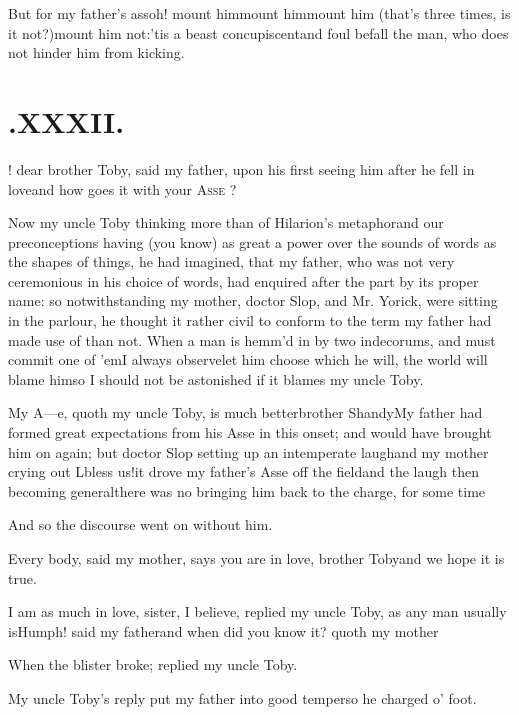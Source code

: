 \documentclass[twoside]{article}
\begin{document}
\noindent
\tsh But for my father’s ass\tsh oh!
mount him\tsk mount him\tsk mount him\tsk \break
(that’s three times, is it not?)\tsk mount him not:\tsk ’tis a beast
concupiscent\tsk and foul befall the man, who does not hinder him
from kicking.

\vfill{}\eject\null
\section{.\enspace XXXII.}

! dear brother Toby, said\break
my father, upon his first seeing him after he fell in
love\tsk and how goes it with your \textsc{Asse} ?

Now my uncle Toby thinking more 
than of Hilarion’s metaphor\tsk and our preconceptions having (you know) as great a
power over the sounds of words as the shapes of things, he had imagined, that my
father, who was not very ceremonious in his choice of words, had enquired after the
part by its proper name: so notwithstanding my mother, doctor Slop, and Mr.\@
Yorick, were sitting in the parlour, he thought it rather civil to conform to the
term my father had made use of than not. When a man is hemm’d in by two indecorums,
and must commit one of ’em\tsk I always observe\tsk\break let him choose which he will, the
world will blame him\tsk so I should not be
asto\-nished if it blames my uncle Toby.

My A—e, quoth my uncle Toby, is much
better\tsk brother Shandy\tsk My father had formed great
expectations from his Asse in this onset; and would have brought
him on again; but doctor Slop setting up an intemperate
laugh\tsk and my mother crying out L\tsk bless us!\tsk it
drove my father’s Asse off the field\tsk and the laugh then
becoming general\tsk there was no bringing him back to the
charge, for some time\tsh{}

And so the discourse went on without him.

Every body, said my mother, says\break
you are in love, brother Toby\tsk and we\break
hope it is true.

I am as much in love, sister, I believe, replied my uncle
Toby, as any man usually is\tsk Humph! said my
father\tsk\break and when did you know it? quoth my
mother\tsh

\tsh When the blister broke; replied my uncle
Toby.

My uncle Toby’s reply put my father into good
temper\tsk so he charged o’ foot.
\end{document}
